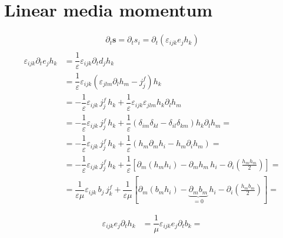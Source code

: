 \documentclass[letterpaper,10pt,italian]{jupyterBook}
\begin{document}
\section{Linear media \sphinxhyphen{} momentum}
\label{\detokenize{ch/energy-linear:linear-media-momentum}}\begin{equation*}
\begin{split}\partial_t \mathbf{s} = \partial_t s_i = \partial_t \left( \varepsilon_{ijk} e_j h_k \right)\end{split}
\end{equation*}\begin{equation*}
\begin{split}\begin{aligned}
  \varepsilon_{ijk} \partial_t e_j h_k
  & = \dfrac{1}{\varepsilon} \varepsilon_{ijk} \partial_t d_j h_k \\
  & = \dfrac{1}{\varepsilon} \varepsilon_{ijk} \left(\varepsilon_{jlm} \partial_l h_m - j^f_j \right) h_k \\
  & = - \dfrac{1}{\varepsilon} \varepsilon_{ijk} \, j^f_j \, h_k + \dfrac{1}{\varepsilon} \varepsilon_{ijk} \varepsilon_{jlm} h_k \partial_l h_m \\
  & = - \dfrac{1}{\varepsilon} \varepsilon_{ijk} \, j^f_j \, h_k + \dfrac{1}{\varepsilon} \left( \delta_{im} \delta_{kl} - \delta_{il} \delta_{km} \right) h_k \partial_l h_m =  \\
  & = - \dfrac{1}{\varepsilon} \varepsilon_{ijk} \, j^f_j \, h_k + \dfrac{1}{\varepsilon} \left( h_m \partial_m h_i - h_m \partial_i h_m \right) =  \\
  & = - \dfrac{1}{\varepsilon} \varepsilon_{ijk} \, j^f_j \, h_k + \dfrac{1}{\varepsilon} \left[ \partial_m ( h_m  h_i ) - \partial_m h_m \, h_i - \partial_i \left( \frac{h_m h_m}{2} \right) \right] =  \\
  & = \dfrac{1}{\varepsilon \mu} \varepsilon_{ijk} \, b_j \, j^f_k + \dfrac{1}{\varepsilon \mu} \left[ \partial_m ( b_m  h_i ) - \underbrace{\partial_m b_m}_{=0} \, h_i - \partial_i \left( \frac{h_m b_m}{2} \right) \right] =  \\
\end{aligned}\end{split}
\end{equation*}\begin{equation*}
\begin{split}\begin{aligned}
  \varepsilon_{ijk} e_j \partial_t h_k
  & =   \dfrac{1}{\mu} \varepsilon_{ijk} e_j \partial_t b_k = \\

\end{aligned}
\end{split}
\end{equation*}
\end{document}
